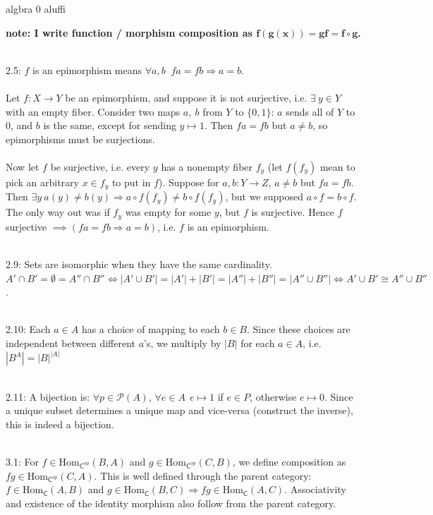 \documentclass{article}
\newcommand{\hsp}[1][5]{\hspace{0.#1 cm}}
\newcommand{\imp}{\Rightarrow}
\newcommand{\POW}{\mathcal{P}}
\newcommand{\cat}{\mathsf{C}}
\newcommand{\HOM}{\text{Hom}}
\begin{document}
\begin{center}
algbra 0 aluffi
\end{center}
\begin{flushleft}
\textbf{note: I write function / morphism composition as $\mathbf{f(g(x)) = gf = f \circ g}$.}\\\ 

\hangindent=0.5cm 
2.5: $f$ is an epimorphism means $\forall a, b\ $ $fa=fb \imp a=b$.\\\ \\\hsp
Let $f:X\rightarrow Y$ be an epimorphism, and suppose it is not surjective, i.e. $\exists\ y \in Y$ with an empty fiber. Consider two maps $a,\ b$ from $Y$ to $\{0,1\}$: $a$ sends all of $Y$ to $0$, and $b$ is the same, except for sending $y \mapsto 1$. Then $fa = fb$ but $a \neq b$, so epimorphisms must be surjections.\\\ \\\hsp
Now let $f$ be surjective, i.e. every $y$ has a nonempty fiber $f_y$ (let $f(f_y)$ mean to pick an arbitrary $x\in f_y$ to put in $f$). Suppose for $a, b : Y \rightarrow Z$, $a\neq b$ but $fa = fb$.\\\hsp Then $\exists y\ a(y) \neq b(y) \imp a\circ f(f_y) \neq b\circ f(f_y)$, but we supposed $a \circ f = b \circ f$. The only way out was if $f_y$ was empty for some $y$, but $f$ is surjective. Hence $f$ surjective $\implies (fa = fb \imp a=b)$, i.e. $f$ is an epimorphism.\\\ 

2.9: Sets are isomorphic when they have the same cardinality. $A'\cap B' = \emptyset = A'' \cap B'' \iff |A' \cup B'| = |A'| + |B'| = |A''| + |B''| = |A'' \cup B''| \iff A' \cup B' \cong A'' \cup B''$.\\\ 

2.10: Each $a \in A$ has a choice of mapping to each $b \in B$. Since these choices are independent between different $a$'s, we multiply by $|B|$ for each $a \in A$, i.e. $|B^A| = |B|^{|A|}$\\\ 

2.11: A bijection is: $\forall p\in \POW(A)$, $\forall e\in A\ \ e\mapsto 1$ if $e \in P$, otherwise $e\mapsto 0$. Since a unique subset determines a unique map and vice-versa (construct the inverse), this is indeed a bijection.\\\ 

3.1: For $f \in \HOM_{\cat^{op}}(B,A)$ and $g \in \HOM_{\cat^{op}}(C,B)$, we define composition as $fg \in \HOM_{\cat^{op}}(C,A)$. This is well defined through the parent category: $f \in \HOM_\cat(A,B)$ and $g\in \HOM_\cat(B,C) \imp fg \in \HOM_\cat(A,C)$. Associativity and existence of the identity morphism also follow from the parent category.\\\ 


\end{flushleft}
\end{document}
